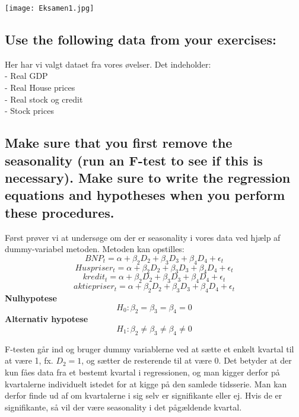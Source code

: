\documentclass[
  10pt,
]{article}
\begin{document}
\texttt{[image: Eksamen1.jpg]} \newpage

\hypertarget{use-the-following-data-from-your-exercises}{%
\subsection{Use the following data from your
exercises:}\label{use-the-following-data-from-your-exercises}}

Her har vi valgt dataet fra vores øvelser. Det indeholder:\\
- Real GDP\\
- Real House prices\\
- Real stock og credit\\
- Stock prices\\

\hypertarget{make-sure-that-you-first-remove-the-seasonality-run-an-f-test-to-see-if-this-is-necessary.-make-sure-to-write-the-regression-equations-and-hypotheses-when-you-perform-these-procedures.}{%
\subsection{Make sure that you first remove the seasonality (run an
F-test to see if this is necessary). Make sure to write the regression
equations and hypotheses when you perform these
procedures.}\label{make-sure-that-you-first-remove-the-seasonality-run-an-f-test-to-see-if-this-is-necessary.-make-sure-to-write-the-regression-equations-and-hypotheses-when-you-perform-these-procedures.}}

\leavevmode

Først prøver vi at undersøge om der er seasonality i vores data ved
hjælp af dummy-variabel metoden. Metoden kan opstilles:
\[BNP_t = \alpha+\beta_2D_2+\beta_3D_3+\beta_4D_4+\epsilon_t\]
\[Huspriser_t = \alpha+\beta_2D_2+\beta_3D_3+\beta_4D_4+\epsilon_t\]
\[kredit_t = \alpha+\beta_2D_2+\beta_3D_3+\beta_4D_4+\epsilon_t\]
\[aktiepriser_t = \alpha+\beta_2D_2+\beta_3D_3+\beta_4D_4+\epsilon_t\]
\textbf{Nulhypotese} \[
H_0 : \beta_2 = \beta_3 = \beta_4 = 0 
\tag{No seasonality} \] \textbf{Alternativ hypotese} \[
H_1 : \beta_2 \neq \beta_3 \neq \beta_4 \neq 0 
\tag{Seasonality} \]

F-testen går ind og bruger dummy variablerne ved at sætte et enkelt
kvartal til at være 1, fx. \(D_2=1\), og sætter de resterende til at
være 0. Det betyder at der kun fåes data fra et bestemt kvartal i
regressionen, og man kigger derfor på kvartalerne individuelt istedet
for at kigge på den samlede tidsserie. Man kan derfor finde ud af om
kvartalerne i sig selv er signifikante eller ej. Hvis de er
signifikante, så vil der være seasonality i det pågældende kvartal.
\end{document}
